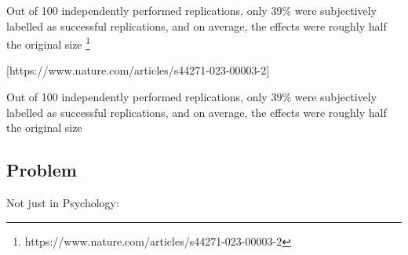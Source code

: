 \documentclass[
  letterpaper,
  DIV=11,
  numbers=noendperiod]{scrartcl}
\begin{document}
\begin{figure}[H]


\caption{\label{fig-opensci}}

\end{figure}%

Out of 100 independently performed replications, only 39\% were
subjectively labelled as successful replications, and on average, the
effects were roughly half the original size \footnote{https://www.nature.com/articles/s44271-023-00003-2}

{[}https://www.nature.com/articles/s44271-023-00003-2{]}

Out of 100 independently performed replications, only 39\% were
subjectively labelled as successful replications, and on average, the
effects were roughly half the original size

\subsection{Problem}\label{problem-4}

Not just in Psychology:
\end{document}
